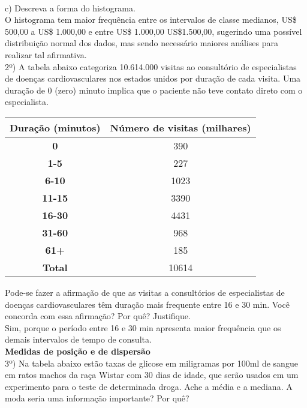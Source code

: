 \documentclass[12pt,a4paper]{article}
\begin{document}
	\vspace{0.5cm}\\
	c) Descreva a forma do histograma.
	\vspace{0.5cm}\\
	O histograma tem maior frequência entre os intervalos de classe medianos, US\$ 500,00 a US\$ 1.000,00 e entre US\$ 1.000,00 US\$1.500,00, sugerindo uma possível distribuição normal dos dados, mas sendo necessário maiores análises para realizar tal afirmativa.
	\vspace{1cm}\\
	2º) A tabela abaixo categoriza 10.614.000 visitas ao consultório de especialistas de
	doenças cardiovasculares nos estados unidos por duração de cada visita. Uma duração de 0 (zero) minuto implica que o paciente não teve contato direto com o especialista.\\
	\begin{center}
		\begin{tabular}{|c|c|} \hline
			\textbf{Duração (minutos)} & \textbf{Número de visitas (milhares)}\\ \hline
			\textbf{0} & 390\\ \hline 
			\textbf{1-5} & 227\\ \hline
			\textbf{6-10} & 1023\\ \hline
			\textbf{11-15} & 3390\\ \hline
			\textbf{16-30} & 4431\\ \hline
			\textbf{31-60} & 968\\ \hline
			\textbf{61+} & 185\\ \hline
			\textbf{Total} & 10614\\ \hline
		\end{tabular}
	\end{center}
	\vspace{0.5cm}
	Pode-se fazer a afirmação de que as visitas a consultórios de especialistas de doenças cardiovasculares têm duração mais frequente entre 16 e 30 min. Você concorda com	essa afirmação? Por quê? Justifique.
	\vspace{0.5cm}\\
	Sim, porque o período entre 16 e 30 min apresenta maior frequência que os demais intervalos de tempo de consulta.
	\vspace{1cm}\\
	\textbf{Medidas de posição e de dispersão}\\
	3º) Na tabela abaixo estão taxas de glicose em miligramas por 100ml de sangue em ratos machos da raça Wistar com 30 dias de idade, que serão usados em um experimento para o teste de determinada droga. Ache a média e a mediana. A moda seria uma informação importante? Por quê?\\
\end{document}
